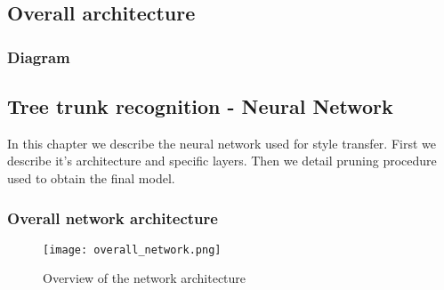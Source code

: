 \documentclass[../Main.tex]{subfiles}
\begin{document}
\subsection{Overall architecture}
\subsubsection{Diagram}

\subsection{Tree trunk recognition - Neural Network} \label{network}
    In this chapter we describe the neural network used for style transfer. 
    First we describe it's architecture and specific layers. Then we detail
    pruning procedure used to obtain the final model.
    
    \subsubsection{Overall network architecture} 
    
    \begin{figure}[ht!]
        \texttt{[image: overall\_network.png]}
        \caption{Overview of the network architecture \cite{Li2018}}
        \label{fig:overall_network}
    \end{figure}
    
\end{document}
